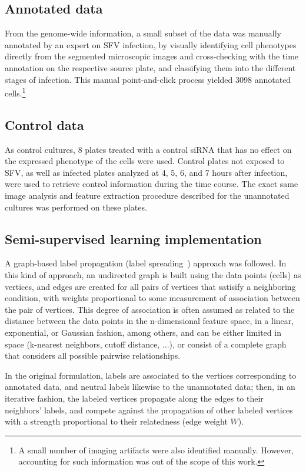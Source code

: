 \documentclass[oneside, a4paper, draft]{memoir} %
\begin{document}
\subsection{Annotated data}
From the genome-wide information, a small subset of the data was manually annotated by an expert on SFV infection, by
visually identifying cell phenotypes directly from the segmented microscopic images and cross-checking with the time
annotation on the respective source plate, and classifying them into the different stages of infection. This manual
point-and-click process yielded  3098 annotated cells.\footnote{A small number of
imaging artifacts were also identified manually. However, accounting for such information was out of the scope of
this work.}

\subsection{Control data}
As control cultures, 8 plates treated with a control siRNA that has no effect on the expressed phenotype of the cells
were used. Control plates not exposed to SFV, as well as infected plates analyzed at 4, 5, 6, and 7 hours after
infection, were used to retrieve control information during the time course. The exact same image analysis and
feature extraction procedure described for the unannotated cultures was performed on these plates. 

\subsection{Semi-supervised learning implementation}
A graph-based label propagation (label spreading~\cite{zhou2004learning}) approach was followed. In this kind of
approach, an undirected graph is built using the data points (cells) as vertices, and edges are created for all pairs
of vertices that satisify a neighboring condition, with weights proportional to some measurement of association
between the pair of vertices. This degree of association is often assumed as related to the distance
between the data points in the n-dimensional feature space, in a linear, exponential, or Gaussian fashion, among
others, and can be either limited in space (k-nearest neighbors, cutoff distance, ...), or consist of a
complete graph that considers all possible pairwise relationships.

In the original formulation, labels are associated to the vertices corresponding to annotated data, and neutral labels
likewise to the unannotated data; then, in an iterative fashion, the labeled vertices propagate along the edges to
their neighbors' labels, and compete against the propagation of other labeled vertices with a strength proportional to
their relatedness (edge weight $W$).
\end{document}

